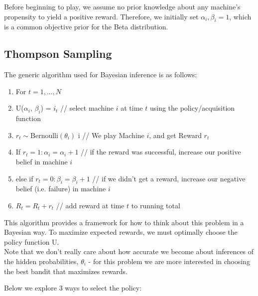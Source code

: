 \documentclass{article}
\begin{document}
Before beginning to play, we assume no prior knowledge about any machine's propensity to yield a positive reward. Therefore, we initially set $\alpha_i, \beta_i = 1$, which is a common objective prior for the Beta distribution.\\

\subsection{Thompson Sampling}

The generic algorithm used for Bayesian inference is as follows:

\begin{enumerate}
\item For $t = 1, ..., N$
\item U($\alpha_i$, $\beta_i$) = $i_t$  // select machine $i$ at time $t$ using the policy/acquisition function
\item $r_t \sim \text{Bernoulli}(\theta_{i})$  i  // We play Machine $i$, and get Reward $r_t$
\item If $r_t = 1: \alpha_i = \alpha_i + 1$   // if the reward was successful, increase our positive belief in machine $i$
\item else if $r_t = 0: \beta_i = \beta_i + 1$  // if we didn't get a reward, increase our negative belief (i.e. failure) in machine $i$
\item $R_t = R_t + r_t$		// add reward at time $t$ to running total
\end{enumerate}

This algorithm provides a framework for how to think about this problem in a Bayesian way. To maximize expected rewards, we must optimally choose the policy function U.\\

Note that we don't really care about how accurate we become about inferences of the hidden probabilities, $\theta_i$ - for this problem we are more interested in choosing the best bandit that maximizes rewards.

Below we explore 3 ways to select the policy:
\end{document}
